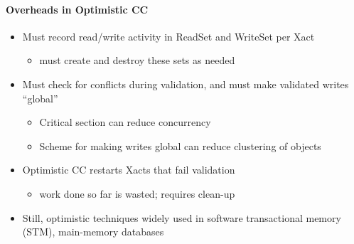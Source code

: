 \paragraph{Overheads in Optimistic CC}
\begin{itemize}
\item Must record read/write activity in ReadSet and WriteSet
  per Xact
  \begin{itemize}
  \item must create and destroy these sets as needed
  \end{itemize}

\item Must check for conflicts during validation, and must
  make validated writes ``global''
  \begin{itemize}
  \item Critical section can reduce concurrency
  \item Scheme for making writes global can reduce clustering of
    objects
  \end{itemize}

\item Optimistic CC restarts Xacts that fail validation
  \begin{itemize}
  \item work done so far is wasted; requires clean-up
  \end{itemize}

\item Still, optimistic techniques widely used in
  software transactional memory (STM), main-memory databases
\end{itemize}


